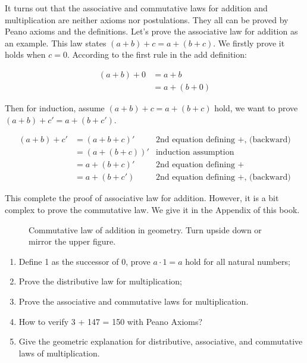 \documentclass[UTF8]{article}
\begin{document}
It turns out that the associative and commutative laws for addition and multiplication are neither axioms nor postulations. They all can be proved by Peano axioms and the definitions. Let's prove the associative law for addition as an example. This law states $(a + b) + c= a + (b + c)$. We firstly prove it holds when $c=0$. According to the first rule in the add definition:

\[
\begin{array}{rl}
(a + b) + 0 & = a + b \\
            & = a + (b + 0)
\end{array}
\]

Then for induction, assume $(a + b) + c = a + (b + c)$ hold, we want to prove $(a + b) + c' = a + (b + c')$.

\[
\begin{array}{rlr}
(a + b) + c' & = (a + b + c)' & \text{2nd equation defining +, (backward)} \\
             & = (a + (b + c))' & \text{induction assumption} \\
             & = a + (b + c)' & \text{2nd equation defining +} \\
             & = a + (b + c') & \text{2nd equation defining +, (backward)}
\end{array}
\]

This complete the proof of associative law for addition. However, it is a bit complex to prove the commutative law. We give it in the Appendix of this book.

\begin{figure}[htbp]
\centering
{}
\caption{Commutative law of addition in geometry. Turn upside down or mirror the upper figure.}
\end{figure}

\begin{Exercise}
\begin{enumerate}
\item Define 1 as the successor of 0, prove $a \cdot 1 = a$ hold for all natural numbers;
\item Prove the distributive law for multiplication;
\item Prove the associative and commutative laws for multiplication.
\item How to verify 3 + 147 = 150 with Peano Axioms?
\item Give the geometric explanation for distributive, associative, and commutative laws of multiplication.
\end{enumerate}
\end{Exercise}
\end{document}

